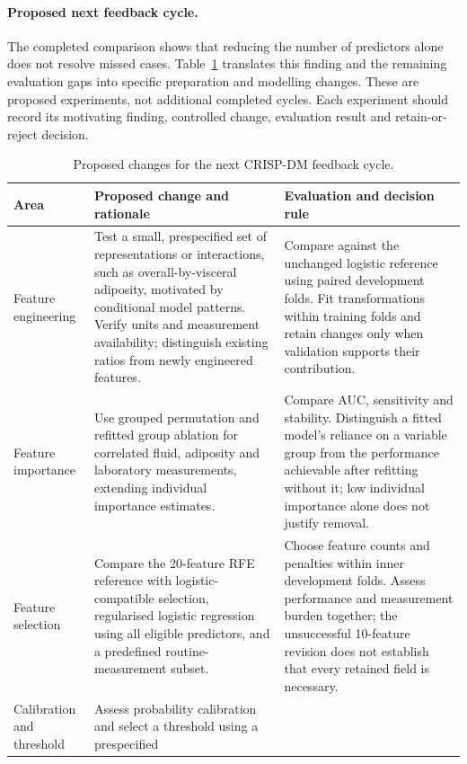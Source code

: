 \paragraph{Proposed next feedback cycle.}
The completed comparison shows that reducing the number of predictors alone
does not resolve missed cases. Table~\ref{tab:next-dm-cycle} translates this
finding and the remaining evaluation gaps into specific preparation and
modelling changes. These are proposed experiments, not additional completed
cycles. Each experiment should record its motivating finding, controlled
change, evaluation result and retain-or-reject decision.

\begin{table}[htbp]
\centering
\small
\caption{Proposed changes for the next CRISP-DM feedback cycle.}
\label{tab:next-dm-cycle}
\begin{tabularx}{\textwidth}{@{}p{2.3cm}XX@{}}
\toprule
Area & Proposed change and rationale & Evaluation and decision rule \\
\midrule
Feature engineering &
Test a small, prespecified set of representations or interactions, such as
overall-by-visceral adiposity, motivated by conditional model patterns.
Verify units and measurement availability; distinguish existing ratios from
newly engineered features. &
Compare against the unchanged logistic reference using paired development
folds. Fit transformations within training folds and retain changes only
when validation supports their contribution. \\
\addlinespace
Feature importance &
Use grouped permutation and refitted group ablation for correlated fluid,
adiposity and laboratory measurements, extending individual importance
estimates. &
Compare AUC, sensitivity and stability. Distinguish a fitted model's reliance
on a variable group from the performance achievable after refitting without
it; low individual importance alone does not justify removal. \\
\addlinespace
Feature selection &
Compare the 20-feature RFE reference with logistic-compatible selection,
regularised logistic regression using all eligible predictors, and a
predefined routine-measurement subset. &
Choose feature counts and penalties within inner development folds. Assess
performance and measurement burden together; the unsuccessful 10-feature
revision does not establish that every retained field is necessary. \\
\addlinespace
Calibration and threshold &
Assess probability calibration and select a threshold using a prespecified

\end{tabularx}
\end{table}
